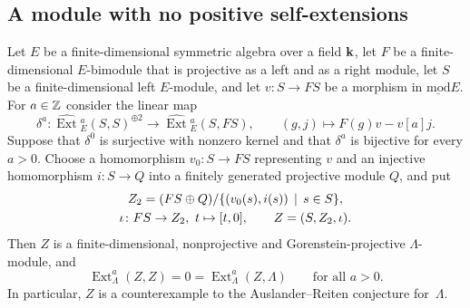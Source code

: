 \subsection{A module with no positive self-extensions}
\label{subsec:conversion-theorem}

\begin{theorem}
  \label{thm:conversion}
  Let $E$ be a finite-dimensional symmetric algebra over a field $\mathbf{k}$, let $F$
  be a finite-dimensional $E$-bimodule that is projective as a left and as a
  right module, let $S$ be a finite-dimensional left $E$-module, and let
  ${v\colon S\to FS}$ be a morphism in $\operatorname{\underline{mod}}E$. For
  ${a\in\mathbb{Z}}$ consider the linear map
  \[
    \delta^a\colon\widehat{\operatorname{Ext}}{}^a_E(S,S)^{\oplus2}
    \longrightarrow\widehat{\operatorname{Ext}}{}^a_E(S,FS),\qquad
    (g,j)\longmapsto F(g)v-v[a]j.
  \]
  Suppose that $\delta^0$ is surjective with nonzero kernel and that $\delta^a$
  is bijective for every ${a>0}$. Choose a homomorphism ${v_0\colon S\to FS}$
  representing $v$ and an injective homomorphism ${i\colon S\to Q}$ into a
  finitely generated projective module $Q$, and put
  \[
    \begin{gathered}
    Z_2=(FS\oplus Q)/\set{(v_0(s),i(s))}[s\in S],\\
    \iota\colon FS\to Z_2,\ t\mapsto[t,0],\qquad Z=(S,Z_2,\iota).
    \end{gathered}
  \]
  Then $Z$ is a finite-dimensional, nonprojective and Gorenstein-projective
  $\Lambda$-module, and
  \[
    \operatorname{Ext}^a_\Lambda(Z,Z)=0=\operatorname{Ext}^a_\Lambda(Z,\Lambda)
    \qquad\text{for all }a>0.
  \]
  In particular, $Z$ is a counterexample to the Auslander--Reiten conjecture
  for~$\Lambda$.
\end{theorem}

